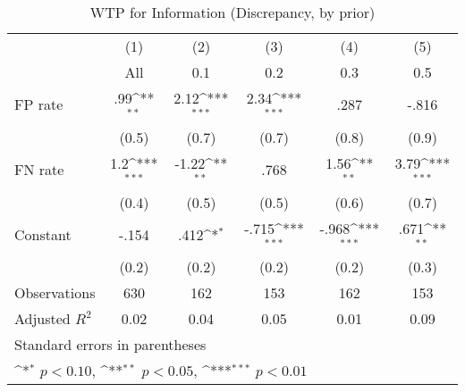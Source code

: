 \begin{table}[htbp]\centering
\def\sym#1{\ifmmode^{#1}\else\(^{#1}\)\fi}
\caption{WTP for Information (Discrepancy, by prior)}
\begin{tabular}{l*{5}{c}}
\hline\hline
                &\multicolumn{1}{c}{(1)}&\multicolumn{1}{c}{(2)}&\multicolumn{1}{c}{(3)}&\multicolumn{1}{c}{(4)}&\multicolumn{1}{c}{(5)}\\
                &\multicolumn{1}{c}{All}&\multicolumn{1}{c}{0.1}&\multicolumn{1}{c}{0.2}&\multicolumn{1}{c}{0.3}&\multicolumn{1}{c}{0.5}\\
\hline
FP rate         &      .99\sym{**} &     2.12\sym{***}&     2.34\sym{***}&     .287         &    -.816         \\
                &    (0.5)         &    (0.7)         &    (0.7)         &    (0.8)         &    (0.9)         \\
FN rate         &      1.2\sym{***}&    -1.22\sym{**} &     .768         &     1.56\sym{**} &     3.79\sym{***}\\
                &    (0.4)         &    (0.5)         &    (0.5)         &    (0.6)         &    (0.7)         \\
Constant        &    -.154         &     .412\sym{*}  &    -.715\sym{***}&    -.968\sym{***}&     .671\sym{**} \\
                &    (0.2)         &    (0.2)         &    (0.2)         &    (0.2)         &    (0.3)         \\
\hline
Observations    &      630         &      162         &      153         &      162         &      153         \\
Adjusted \(R^{2}\)&     0.02         &     0.04         &     0.05         &     0.01         &     0.09         \\
\hline\hline
\multicolumn{6}{l}{\footnotesize Standard errors in parentheses}\\
\multicolumn{6}{l}{\footnotesize \sym{*} \(p<0.10\), \sym{**} \(p<0.05\), \sym{***} \(p<0.01\)}\\
\end{tabular}
\end{table}
